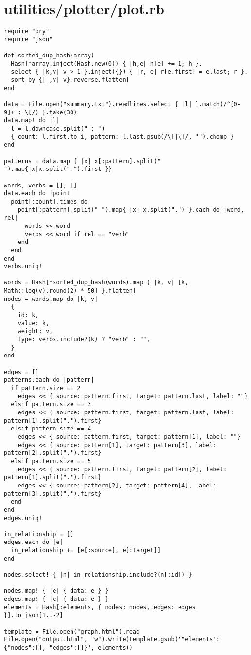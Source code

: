\documentclass{article}
\begin{document}
\section*{utilities/plotter/plot.rb}
\begin{verbatim}
require "pry"
require "json"

def sorted_dup_hash(array)
  Hash[*array.inject(Hash.new(0)) { |h,e| h[e] += 1; h }.
  select { |k,v| v > 1 }.inject({}) { |r, e| r[e.first] = e.last; r }.
  sort_by {|_,v| v}.reverse.flatten]
end

data = File.open("summary.txt").readlines.select { |l| l.match(/^[0-9]+ : \[/) }.take(30)
data.map! do |l|
  l = l.downcase.split(" : ")
  { count: l.first.to_i, pattern: l.last.gsub(/\[|\]/, "").chomp }
end

patterns = data.map { |x| x[:pattern].split(" ").map{|x|x.split(".").first }}

words, verbs = [], []
data.each do |point|
  point[:count].times do
    point[:pattern].split(" ").map{ |x| x.split(".") }.each do |word, rel|
      words << word
      verbs << word if rel == "verb"
    end
  end
end
verbs.uniq!

words = Hash[*sorted_dup_hash(words).map { |k, v| [k, Math::log(v).round(2) * 50] }.flatten]
nodes = words.map do |k, v|
  {
    id: k,
    value: k,
    weight: v,
    type: verbs.include?(k) ? "verb" : "",
  }
end

edges = []
patterns.each do |pattern|
  if pattern.size == 2
    edges << { source: pattern.first, target: pattern.last, label: ""}
  elsif pattern.size == 3
    edges << { source: pattern.first, target: pattern.last, label: pattern[1].split(".").first}
  elsif pattern.size == 4
    edges << { source: pattern.first, target: pattern[1], label: ""}
    edges << { source: pattern[1], target: pattern[3], label: pattern[2].split(".").first}
  elsif pattern.size == 5
    edges << { source: pattern.first, target: pattern[2], label: pattern[1].split(".").first}
    edges << { source: pattern[2], target: pattern[4], label: pattern[3].split(".").first}
  end
end
edges.uniq!

in_relationship = []
edges.each do |e|
  in_relationship += [e[:source], e[:target]]
end

nodes.select! { |n| in_relationship.include?(n[:id]) }

nodes.map! { |e| { data: e } }
edges.map! { |e| { data: e } }
elements = Hash[:elements, { nodes: nodes, edges: edges }].to_json[1..-2]

template = File.open("graph.html").read
File.open("output.html", "w").write(template.gsub('"elements":{"nodes":[], "edges":[]}', elements))


\end{verbatim}
\pagebreak
\end{document}
